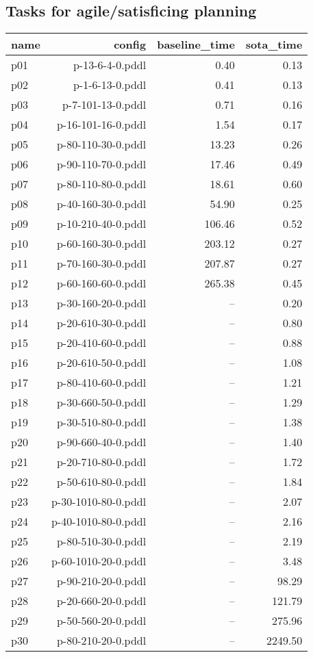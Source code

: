 \documentclass{article}
\begin{document}
                    \subsection*{Tasks for agile/satisficing planning}
                    
                            \begin{center}
                            \scriptsize
                            \begin{tabular}{@{}l|r|r|r@{}}
                            name & config & baseline\_time & sota\_time\\\midrule
                              p01& p-13-6-4-0.pddl&0.40&0.13\\
  p02& p-1-6-13-0.pddl&0.41&0.13\\
  p03& p-7-101-13-0.pddl&0.71&0.16\\
  p04& p-16-101-16-0.pddl&1.54&0.17\\
  p05& p-80-110-30-0.pddl&13.23&0.26\\
  p06& p-90-110-70-0.pddl&17.46&0.49\\
  p07& p-80-110-80-0.pddl&18.61&0.60\\
  p08& p-40-160-30-0.pddl&54.90&0.25\\
  p09& p-10-210-40-0.pddl&106.46&0.52\\
  p10& p-60-160-30-0.pddl&203.12&0.27\\
  p11& p-70-160-30-0.pddl&207.87&0.27\\
  p12& p-60-160-60-0.pddl&265.38&0.45\\
  p13& p-30-160-20-0.pddl&--&0.20\\
  p14& p-20-610-30-0.pddl&--&0.80\\
  p15& p-20-410-60-0.pddl&--&0.88\\
  p16& p-20-610-50-0.pddl&--&1.08\\
  p17& p-80-410-60-0.pddl&--&1.21\\
  p18& p-30-660-50-0.pddl&--&1.29\\
  p19& p-30-510-80-0.pddl&--&1.38\\
  p20& p-90-660-40-0.pddl&--&1.40\\
  p21& p-20-710-80-0.pddl&--&1.72\\
  p22& p-50-610-80-0.pddl&--&1.84\\
  p23& p-30-1010-80-0.pddl&--&2.07\\
  p24& p-40-1010-80-0.pddl&--&2.16\\
  p25& p-80-510-30-0.pddl&--&2.19\\
  p26& p-60-1010-20-0.pddl&--&3.48\\
  p27& p-90-210-20-0.pddl&--&98.29\\
  p28& p-20-660-20-0.pddl&--&121.79\\
  p29& p-50-560-20-0.pddl&--&275.96\\
  p30& p-80-210-20-0.pddl&--&2249.50
                            \end{tabular}
                            \end{center}
                    
\end{document}
